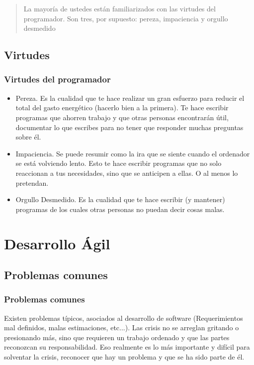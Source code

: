 \documentclass[12pt]{beamer}
\begin{document}
\begin{frame}
 \begin{quote}
  La mayoría de ustedes están familiarizados con las virtudes del programador. Son tres, por supuesto: pereza, impaciencia y orgullo desmedido
 \newline
 \end{quote}
\end{frame}


\subsection{Virtudes}

\begin{frame}
 \frametitle{Virtudes del programador}
 \begin{itemize}
  \item<2-> \alert{Pereza}. Es la cualidad que te hace realizar un gran esfuerzo para reducir el total del gasto energético (hacerlo bien a la primera). Te hace escribir programas que ahorren trabajo y que otras personas encontrarán útil, documentar lo que escribes para no tener que responder muchas preguntas sobre él.
  \item<3-> \alert{Impaciencia}. Se puede resumir como la ira que se siente cuando el ordenador se está volviendo lento. Esto te hace escribir programas que no solo reaccionan a tus necesidades, sino que se anticipen a ellas. O al menos lo pretendan.
  \item<4-> \alert{Orgullo Desmedido}. Es la cualidad que te hace escribir (y mantener) programas de los cuales otras personas no puedan decir cosas malas. 
  \end{itemize}
\end{frame}

\section{Desarrollo Ágil}


\subsection{Problemas comunes}
\begin{frame}
 \frametitle{Problemas comunes}
 Existen problemas típicos, asociados al desarrollo de software (Requerimientos mal definidos, malas estimaciones, etc...).
 \newline
 Las crisis no se arreglan gritando o presionando más, sino que requieren un trabajo \alert{ordenado} y que las partes reconozcan su responsabilidad. Eso realmente es lo más importante y difícil para solventar la crisis, reconocer que hay un problema y que se ha sido parte de él.
\end{frame}
\end{document}
